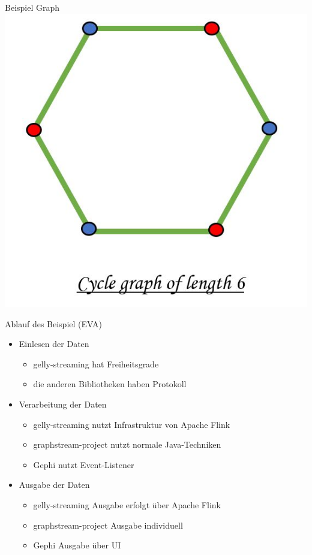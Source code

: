 \documentclass[a4paper, fontsize=11pt]{beamer}
\begin{document}
\begin{frame}{Beispiel Graph}
    \centering
    \includegraphics[scale=0.5]{../material/images/bipartite-graph-six-nodes.jpg}
\end{frame}

\begin{frame}{Ablauf des Beispiel (EVA)}
    \begin{itemize}
        \item Einlesen der Daten
            \begin{itemize}
                \item gelly-streaming hat Freiheitsgrade
                \item die anderen Bibliotheken haben Protokoll
            \end{itemize}
        \item Verarbeitung der Daten
            \begin{itemize}
                \item gelly-streaming nutzt Infrastruktur von Apache Flink
                \item graphstream-project nutzt normale Java-Techniken
                \item Gephi nutzt Event-Listener
            \end{itemize}
        \item Ausgabe der Daten
            \begin{itemize}
                \item gelly-streaming Ausgabe erfolgt über Apache Flink
                \item graphstream-project Ausgabe individuell
                \item Gephi Ausgabe über UI
            \end{itemize}
    \end{itemize}
\end{frame}
\end{document}
